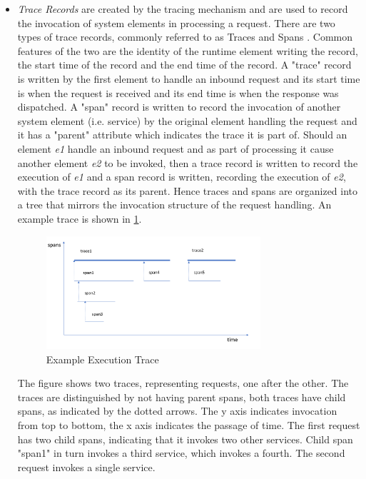\begin{itemize}

\item \emph{Trace Records} are created by the tracing mechanism and are used to record the invocation of system elements in processing a request.  There are two types of trace records, commonly referred to as Traces and Spans \cite{opentracing2018-traces}.  Common features of the two are the identity of the runtime element writing the record, the start time of the record and the end time of the record.  A "trace" record is written by the first element to handle an inbound request and its start time is when the request is received and its end time is when the response was dispatched.  A "span" record is written to record the invocation of another system element (i.e. service) by the original element handling the request and it has a "parent" attribute which indicates the trace it is part of.  Should an element \emph{e1} handle an inbound request and as part of processing it cause another element \emph{e2} to be invoked, then a trace record is written to record the execution of \emph{e1} and a span record is written, recording the execution of \emph{e2}, with the trace record as its parent.  Hence traces and spans are organized into a tree that mirrors the invocation structure of the request handling.  An example trace is shown in \ref{figure:span}.

\begin{figure}
\centering
\includegraphics[width=0.75\textwidth]{Figures/estimating-energy-trace}
\caption{Example Execution Trace}
\label{figure:span}
\end{figure}

The figure shows two traces, representing requests, one after the other.  The traces are distinguished by not having parent spans, both traces have child spans, as indicated by the dotted arrows.  The y axis indicates invocation from top to bottom, the x axis indicates the passage of time.  The first request has two child spans, indicating that it invokes two other services.  Child span "span1" in turn invokes a third service, which invokes a fourth.  The second request invokes a single service.


\end{itemize}
